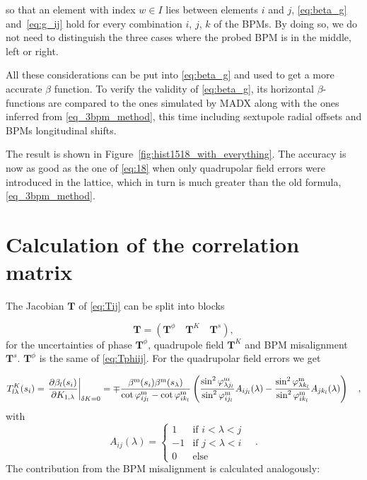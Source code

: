 so that an element with index $ w \in I$ lies between elements $ i $ and $ j $, \eqref{eq:beta_g}
and~\eqref{eq:g_ij} hold for every combination $ i $, $ j $, $ k $ of the BPMs.
 By doing so, we do not need to distinguish the three cases where the probed BPM is in the middle, left or right.


All these considerations can be put into \eqref{eq:beta_g} and used to get a more accurate
$ \beta $ function.
To verify the validity of \eqref{eq:beta_g}, its horizontal $\beta$-functions are compared to the
ones simulated by MADX along with the ones inferred from \eqref{eq_3bpm_method}, this time including
sextupole radial offsets and BPMs longitudinal shifts.

The result is shown in Figure~\ref{fig:hist1518_with_everything}. The accuracy is now as good as the one of \eqref{eq:18}  when only quadrupolar field errors were introduced in the
lattice, which in turn is much greater than the old formula, \eqref{eq_3bpm_method}.

\section{Calculation of the correlation matrix}

The Jacobian $ \mathbf{T} $ of \eqref{eq:Tij} can be split into blocks 

\begin{equation}
\mathbf{T} = \left( \mathbf{T}^\phi \quad \mathbf{T}^K \quad \mathbf{T}^s\right),
\end{equation} 
for the uncertainties of phase $ \mathbf{T}^\phi$, quadrupole field  $\mathbf{T}^K$ and BPM misalignment $\mathbf{T}^s$.
$ \mathbf{T}^\phi $ is the same of \eqref{eq:Tphiij}. For the quadrupolar field errors we get


\begin{align}
	T^K_{l\lambda}(s_i) = 
		\left. \frac{\partial \beta_l(s_i)}{\partial  K_{1,\lambda}}\right|_{\delta K = 0} =
		\mp\frac{\beta^\text{m}(s_i)\beta^\text{m}(s_\lambda)}{\cot\varphi_{ij_l}^\text{m} - \cot\varphi_{ik_l}^\text{m}}\left(
		\frac{\sin^2\varphi_{\lambda j_l}^\text{m}}{\sin^2\varphi_{ij_l}^\text{m}}A_{ij_l}(\lambda) - \frac{\sin^2\varphi_{\lambda k_l}^\text{m}}{\sin^2\varphi_{ik_l}^\text{m}}A_{jk_l}(\lambda)\right)\quad ,
\label{eq:TK}
\end{align}
  with 
  \begin{equation}
    A_{ij}(\lambda) = \left\{\begin{array}{ll}
    1&\text{if }i<\lambda<j\\
    -1&\text{if }j<\lambda<i\\
    0&\text{else}
    \end{array}\right. \quad .
  \end{equation} 
  The contribution from the BPM misalignment is calculated analogously:

